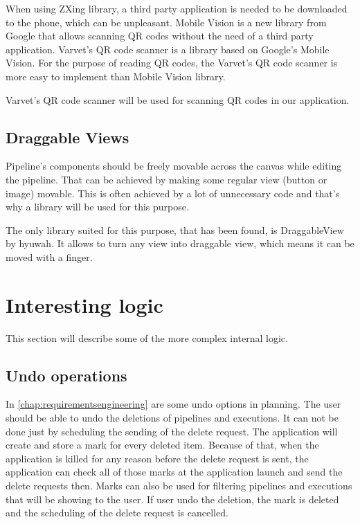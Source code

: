 When using ZXing library, a third party application is needed to be downloaded to the phone, which can be unpleasant.
Mobile Vision is a new library from Google that allows scanning QR codes without the need of a third party application.
Varvet's QR code scanner is a library based on Google's Mobile Vision.
For the purpose of reading QR codes, the Varvet's QR code scanner is more easy to implement than Mobile Vision library.

Varvet's QR code scanner will be used for scanning QR codes in our application.

\subsection{Draggable Views}
Pipeline's components should be freely movable across the canvas while editing the pipeline.
That can be achieved by making some regular view (button or image) movable.
This is often achieved by a lot of unnecessary code and that's why a library will be used for this purpose.

The only library suited for this purpose, that has been found, is DraggableView by hyuwah\cite{draggable}.
It allows to turn any view into draggable view, which means it can be moved with a finger.

\section{Interesting logic}
This section will describe some of the more complex internal logic.

\subsection{Undo operations}
In \autoref{chap:requirementsengineering} are some undo options in planning.
The user should be able to undo the deletions of pipelines and executions.
It can not be done just by scheduling the sending of the delete request.
The application will create and store a mark for every deleted item.
Because of that, when the application is killed for any reason before the delete request is sent, the application can check all of those marks at the application launch and send the delete requests then.
Marks can also be used for filtering pipelines and executions that will be showing to the user.
If user undo the deletion, the mark is deleted and the scheduling of the delete request is cancelled.


